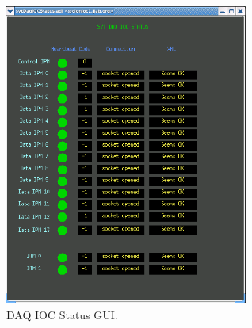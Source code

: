 \documentclass[12pt]{report}
\begin{document}
\begin{figure}[ht!]
\centering
\includegraphics[width=8cm]{svtDaqIOCStatus.png}
\caption{DAQ IOC Status GUI. \label{fig:svtDaqIOCStatus}}
\end{figure}
\end{document}
